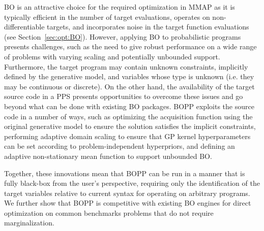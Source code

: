 BO is an attractive choice for the required optimization in MMAP as it is typically efficient in the number of target evaluations, operates on non-differentiable targets, and incorporates noise in the target function evaluations (see Section~\ref{sec:opt:BO}).  However, applying BO to probabilistic programs presents challenges, such as the need to give robust performance on a wide range of problems with varying scaling and potentially unbounded support.  Furthermore, the target program may contain unknown constraints, implicitly defined by the generative model, and variables whose type is unknown (i.e. they may be continuous or discrete).
On the other hand, the availability of the target source code in a PPS presents opportunities to overcome these issues and go beyond what can be done with existing BO packages.  BOPP exploits the source code in a number of ways, such as optimizing the acquisition function using the original generative model to ensure the solution satisfies the implicit constraints, performing adaptive domain scaling to ensure that GP kernel hyperparameters can be set according to problem-independent hyperpriors, and defining an adaptive non-stationary mean function to support unbounded BO. 

Together, these innovations mean that BOPP can be run in a manner that is fully black-box from the user's perspective, requiring only the identification of the target variables relative to current syntax for operating on arbitrary programs. We further show that BOPP is competitive with existing BO engines for direct optimization on common benchmarks problems that do not require marginalization.









